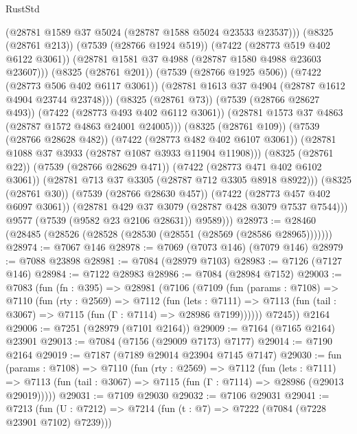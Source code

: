\begin{lexlean}{RustStd}
\begin{coremodule}
                        (@28781 @1589 @37 @5024 (@28787 @1588 @5024 @23533 @23537)))
                      (@8325 (@28761 @213))
                      (@7539 (@28766 @1924 @519))
                      (@7422 (@28773 @519 @402 @6122 @3061))
                      (@28781 @1581 @37 @4988 (@28787 @1580 @4988 @23603 @23607)))
                    (@8325 (@28761 @201))
                    (@7539 (@28766 @1925 @506))
                    (@7422 (@28773 @506 @402 @6117 @3061))
                    (@28781 @1613 @37 @4904 (@28787 @1612 @4904 @23744 @23748)))
                  (@8325 (@28761 @73))
                  (@7539 (@28766 @28627 @493))
                  (@7422 (@28773 @493 @402 @6112 @3061))
                  (@28781 @1573 @37 @4863 (@28787 @1572 @4863 @24001 @24005)))
                (@8325 (@28761 @109))
                (@7539 (@28766 @28628 @482))
                (@7422 (@28773 @482 @402 @6107 @3061))
                (@28781 @1088 @37 @3933 (@28787 @1087 @3933 @11904 @11908)))
              (@8325 (@28761 @22))
              (@7539 (@28766 @28629 @471))
              (@7422 (@28773 @471 @402 @6102 @3061))
              (@28781 @713 @37 @3305 (@28787 @712 @3305 @8918 @8922)))
            (@8325 (@28761 @30))
            (@7539 (@28766 @28630 @457))
            (@7422 (@28773 @457 @402 @6097 @3061))
            (@28781 @429 @37 @3079 (@28787 @428 @3079 @7537 @7544)))
          @9577
          (@7539 (@9582 @23 @2106 @28631))
          @9589)))
@28973 := @28460 (@28485 (@28526 (@28528 (@28530 (@28551 (@28569 (@28586 @28965)))))))
@28974 := @7067 @146
@28978 := @7069 (@7073 @146) (@7079 @146)
@28979 := @7088 @23898
@28981 := @7084 (@28979 @7103)
@28983 := @7126 (@7127 @146)
@28984 := @7122 @28983
@28986 := @7084 (@28984 @7152)
@29003 := @7083
    (fun (fn : @395) =>
    @28981
      (@7106
        (@7109
          (fun (params : @7108) =>
          @7110
            (fun (rty : @2569) =>
            @7112
              (fun (lets : @7111) =>
              @7113 (fun (tail : @3067) => @7115 (fun (Γ : @7114) => @28986 @7199))))))
        @7245))
    @2164
@29006 := @7251 (@28979 (@7101 @2164))
@29009 := @7164 (@7165 @2164) @23901
@29013 := @7084 (@7156 (@29009 @7173) @7177)
@29014 := @7190 @2164
@29019 := @7187 (@7189 @29014 @23904 @7145 @7147)
@29030 := fun (params : @7108) =>
  @7110
    (fun (rty : @2569) =>
    @7112
      (fun (lets : @7111) =>
      @7113 (fun (tail : @3067) => @7115 (fun (Γ : @7114) => @28986 (@29013 @29019)))))
@29031 := @7109 @29030
@29032 := @7106 @29031
@29041 := @7213
    (fun (U : @7212) => @7214 (fun (t : @7) => @7222 (@7084 (@7228 @23901 @7102) @7239)))

\end{coremodule}
\end{lexlean}
